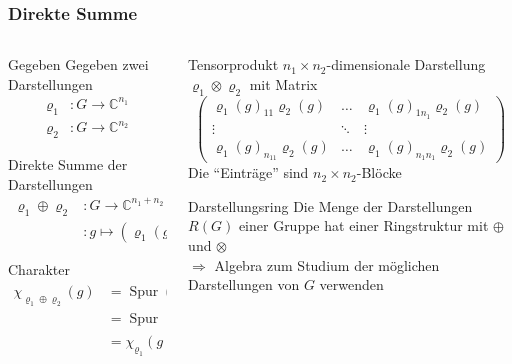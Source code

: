 %
%
%
\bgroup
\begin{frame}[t]
\setlength{\abovedisplayskip}{5pt}
\setlength{\belowdisplayskip}{5pt}
\frametitle{Direkte Summe}
\vspace{-20pt}
\begin{columns}[t,onlytextwidth]
\begin{column}{0.48\textwidth}
\begin{block}{Gegeben}
Gegeben zwei Darstellungen
\begin{align*}
\varrho_1&\colon G \to \mathbb{C}^{n_1}
\\
\varrho_2&\colon G \to \mathbb{C}^{n_2}
\end{align*}
\end{block}
\vspace{-12pt}
\begin{block}{Direkte Summe der Darstellungen}
\vspace{-12pt}
\begin{align*}
\varrho_1\oplus\varrho_2
&\colon
G\to \mathbb{C}^{n_1+n_2} = \mathbb{C}^{n_1}\times\mathbb{C}^{n_2}
=:
\mathbb{C}^{n_1}\oplus\mathbb{C}^{n_2}
\\
&\colon g\mapsto (\varrho_1(g),\varrho_2(g))
\end{align*}
\end{block}
\vspace{-12pt}
\begin{block}{Charakter}
\vspace{-12pt}
\begin{align*}
\chi_{\varrho_1\oplus\varrho_2}(g)
&=
\operatorname{Spur}(\varrho_1\oplus\varrho_2)(g)
\\
&=
\operatorname{Spur}{\varrho_1(g)}
+
\operatorname{Spur}{\varrho_1(g)}
\\
&=
\chi_{\varrho_1}(g)
+
\chi_{\varrho_2}(g)
\end{align*}
\end{block}
\end{column}
\begin{column}{0.48\textwidth}
\begin{block}{Tensorprodukt}
$n_1\times n_2$-dimensionale
Darstellung $\varrho_1\otimes\varrho_2$ mit Matrix
\[
\begin{pmatrix}
\varrho_1(g)_{11} \varrho_2(g)
	&\dots
		&\varrho_1(g)_{1n_1} \varrho_2(g)\\
\vdots&\ddots&\vdots\\
\varrho_1(g)_{n_11} \varrho_2(g)
	&\dots
		&\varrho_1(g)_{n_1n_1} \varrho_2(g)
\end{pmatrix}
\]
Die ``Einträge'' sind $n_2\times n_2$-Blöcke
\end{block}
\begin{block}{Darstellungsring}
Die Menge der Darstellungen $R(G)$  einer Gruppe hat
einer Ringstruktur mit $\oplus$ und $\otimes$
\\
$\Rightarrow$
Algebra zum Studium der möglichen Darstellungen von $G$ verwenden
\end{block}
\end{column}
\end{columns}
\end{frame}
\egroup
